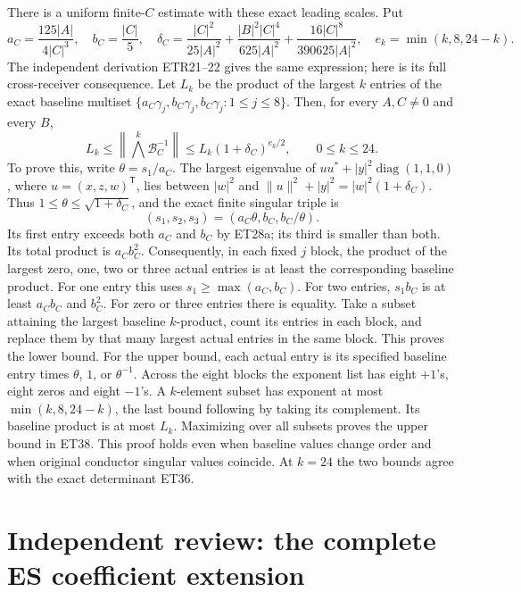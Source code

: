 \documentclass[11pt]{article}
\newcommand{\diag}{\operatorname{diag}}
\begin{document}
There is a uniform finite-$C$ estimate with these exact leading scales.
Put
\[
 a_C=\frac{125|A|}{4|C|^3},\quad b_C=\frac{|C|}{5},\quad
 \delta_C=\frac{|C|^2}{25|A|^2}
       +\frac{|B|^2|C|^4}{625|A|^2}
       +\frac{16|C|^8}{390625|A|^2},\quad
 e_k=\min(k,8,24-k).
 \tag{ET37}
\]
The independent derivation ETR21--22 gives the same expression;
here is its full cross-receiver consequence.
Let $L_k$ be the product of the largest $k$ entries of the exact
baseline multiset
$\{a_C\gamma_j,b_C\gamma_j,b_C\gamma_j:1\le j\le8\}$.
Then, for every $A,C\ne0$ and every $B$,
\[
 L_k\le\left\|\bigwedge^k\mathcal B_C^{-1}\right\|
          \le L_k(1+\delta_C)^{e_k/2},
 \qquad 0\le k\le24 .
 \tag{ET38}
\]
To prove this, write $\theta=s_1/a_C$.
The largest eigenvalue of $uu^*+|y|^2\diag(1,1,0)$, where
$u=(x,z,w)^{\mathsf T}$, lies between $|w|^2$ and
$\|u\|^2+|y|^2=|w|^2(1+\delta_C)$.
Thus $1\le\theta\le\sqrt{1+\delta_C}$, and the exact finite
singular triple is
\[
 (s_1,s_2,s_3)=(a_C\theta,b_C,b_C/\theta).
 \tag{ET39}
\]
Its first entry exceeds both $a_C$ and $b_C$ by ET28a; its third
is smaller than both. Its total product is $a_Cb_C^2$.
Consequently, in each fixed $j$ block, the product of the largest
zero, one, two or three actual entries is at least the corresponding
baseline product. For one entry this uses $s_1\ge\max(a_C,b_C)$.
For two entries, $s_1b_C$ is at least $a_Cb_C$ and $b_C^2$.
For zero or three entries there is equality.
Take a subset attaining the largest baseline $k$-product, count its
entries in each block, and replace them by that many largest actual
entries in the same block. This proves the lower bound.
For the upper bound, each actual entry is its specified baseline
entry times $\theta$, $1$, or $\theta^{-1}$.
Across the eight blocks the exponent list has eight $+1$'s,
eight zeros and eight $-1$'s. A $k$-element subset has exponent
at most $\min(k,8,24-k)$, the last bound following by taking its
complement. Its baseline product is at most $L_k$.
Maximizing over all subsets proves the upper bound in ET38.
This proof holds even when baseline values change order and when
original conductor singular values coincide. At $k=24$ the two
bounds agree with the exact determinant ET36.

\section{Independent review: the complete ES coefficient extension}
\end{document}
